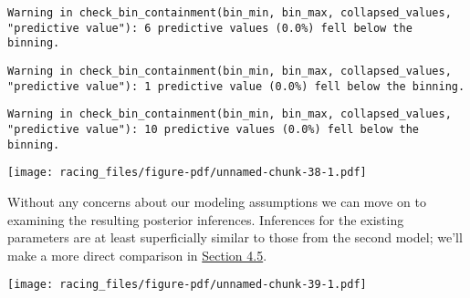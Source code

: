 \documentclass[
  letterpaper,
  DIV=11,
  numbers=noendperiod]{scrartcl}
\newenvironment{Shaded}{\begin{snugshade}}{\end{snugshade}}
\newcommand{\AttributeTok}[1]{\textcolor[rgb]{0.40,0.45,0.13}{#1}}
\newcommand{\DecValTok}[1]{\textcolor[rgb]{0.68,0.00,0.00}{#1}}
\newcommand{\FunctionTok}[1]{\textcolor[rgb]{0.28,0.35,0.67}{#1}}
\newcommand{\NormalTok}[1]{\textcolor[rgb]{0.00,0.23,0.31}{#1}}
\newcommand{\SpecialCharTok}[1]{\textcolor[rgb]{0.37,0.37,0.37}{#1}}
\newcommand{\StringTok}[1]{\textcolor[rgb]{0.13,0.47,0.30}{#1}}
\begin{document}
\begin{verbatim}
Warning in check_bin_containment(bin_min, bin_max, collapsed_values,
"predictive value"): 6 predictive values (0.0%) fell below the binning.
\end{verbatim}

\begin{verbatim}
Warning in check_bin_containment(bin_min, bin_max, collapsed_values,
"predictive value"): 1 predictive value (0.0%) fell below the binning.
\end{verbatim}

\begin{verbatim}
Warning in check_bin_containment(bin_min, bin_max, collapsed_values,
"predictive value"): 10 predictive values (0.0%) fell below the binning.
\end{verbatim}

\texttt{[image: racing\_files/figure-pdf/unnamed-chunk-38-1.pdf]}

Without any concerns about our modeling assumptions we can move on to
examining the resulting posterior inferences. Inferences for the
existing parameters are at least superficially similar to those from the
second model; we'll make a more direct comparison in
\hyperref[sec:inf-comp]{Section 4.5}.

\begin{Shaded}
\end{Shaded}

\texttt{[image: racing\_files/figure-pdf/unnamed-chunk-39-1.pdf]}
\end{document}
